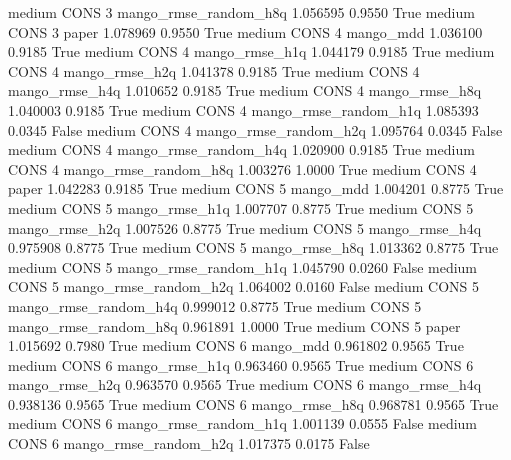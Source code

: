     medium     CONS                 3 mango_rmse_random_h8q   1.056595      0.9550    True
    medium     CONS                 3                 paper   1.078969      0.9550    True
    medium     CONS                 4             mango_mdd   1.036100      0.9185    True
    medium     CONS                 4        mango_rmse_h1q   1.044179      0.9185    True
    medium     CONS                 4        mango_rmse_h2q   1.041378      0.9185    True
    medium     CONS                 4        mango_rmse_h4q   1.010652      0.9185    True
    medium     CONS                 4        mango_rmse_h8q   1.040003      0.9185    True
    medium     CONS                 4 mango_rmse_random_h1q   1.085393      0.0345   False
    medium     CONS                 4 mango_rmse_random_h2q   1.095764      0.0345   False
    medium     CONS                 4 mango_rmse_random_h4q   1.020900      0.9185    True
    medium     CONS                 4 mango_rmse_random_h8q   1.003276      1.0000    True
    medium     CONS                 4                 paper   1.042283      0.9185    True
    medium     CONS                 5             mango_mdd   1.004201      0.8775    True
    medium     CONS                 5        mango_rmse_h1q   1.007707      0.8775    True
    medium     CONS                 5        mango_rmse_h2q   1.007526      0.8775    True
    medium     CONS                 5        mango_rmse_h4q   0.975908      0.8775    True
    medium     CONS                 5        mango_rmse_h8q   1.013362      0.8775    True
    medium     CONS                 5 mango_rmse_random_h1q   1.045790      0.0260   False
    medium     CONS                 5 mango_rmse_random_h2q   1.064002      0.0160   False
    medium     CONS                 5 mango_rmse_random_h4q   0.999012      0.8775    True
    medium     CONS                 5 mango_rmse_random_h8q   0.961891      1.0000    True
    medium     CONS                 5                 paper   1.015692      0.7980    True
    medium     CONS                 6             mango_mdd   0.961802      0.9565    True
    medium     CONS                 6        mango_rmse_h1q   0.963460      0.9565    True
    medium     CONS                 6        mango_rmse_h2q   0.963570      0.9565    True
    medium     CONS                 6        mango_rmse_h4q   0.938136      0.9565    True
    medium     CONS                 6        mango_rmse_h8q   0.968781      0.9565    True
    medium     CONS                 6 mango_rmse_random_h1q   1.001139      0.0555   False
    medium     CONS                 6 mango_rmse_random_h2q   1.017375      0.0175   False
